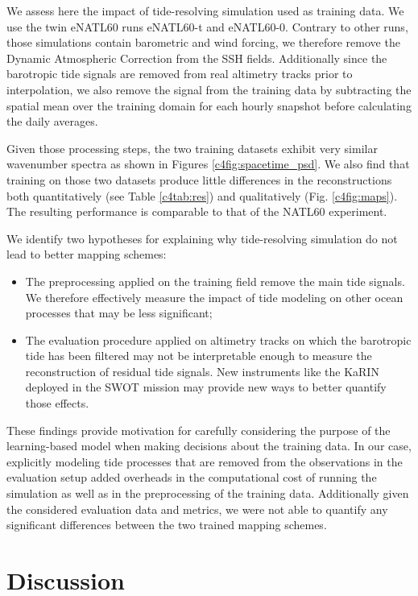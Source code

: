 \begin{bibunit}
We assess here the impact of tide-resolving simulation used as training data. We use the twin eNATL60 runs eNATL60-t and eNATL60-0. Contrary to other runs, those simulations contain barometric and wind forcing, we therefore remove the Dynamic Atmospheric Correction \cite{carrereMajorImprovementAltimetry2016} from the SSH fields. Additionally since the barotropic tide signals are removed from real altimetry tracks prior to interpolation, we also remove the signal from the training data by subtracting the spatial mean over the training domain for each hourly snapshot before calculating the daily averages.  

Given those processing steps, the two training datasets  exhibit very similar wavenumber spectra as shown in Figures \ref{c4fig:spacetime_psd}. 
We also find that training on those two datasets produce little differences in the reconstructions both quantitatively  (see Table \ref{c4tab:res}) and qualitatively (Fig. \ref{c4fig:maps}). The resulting performance is comparable to that of the NATL60 experiment.
 
We identify two hypotheses for explaining why tide-resolving simulation do not lead to better mapping schemes:
\begin{itemize}
    \item The preprocessing applied on the training field remove the main tide signals. We therefore effectively measure the impact of tide modeling on other ocean processes that may be less significant;
    \item The evaluation procedure applied on altimetry tracks on which the barotropic tide has been filtered may not be interpretable enough to measure the reconstruction of residual tide signals. New instruments like the KaRIN deployed in the SWOT mission may provide new ways to better quantify those effects.   
\end{itemize}

These findings provide motivation for carefully considering the purpose of the learning-based model when making decisions about the training data. In our case, explicitly modeling tide processes that are removed from the observations in the evaluation setup added overheads in the computational cost of running the simulation as well as in the preprocessing of the training data. Additionally given the considered evaluation data and metrics, we were not able to quantify any significant differences between the two trained mapping schemes.


\section{Discussion}
\label{c4sec:discussion}




\end{bibunit}
